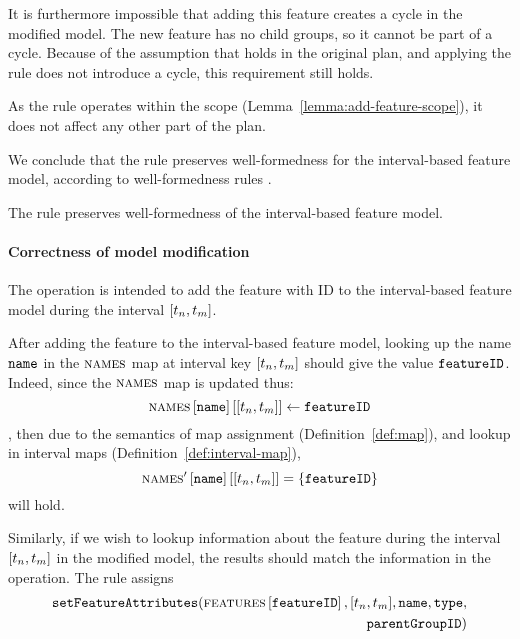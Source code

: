 It is furthermore impossible that adding this feature creates a cycle in the modified model. The new feature has no child groups, so it cannot be part of a cycle. Because of the assumption that  holds in the original plan, and applying the rule does not introduce a cycle, this requirement still holds. 

As the rule operates within the scope (Lemma~\vref{lemma:add-feature-scope}), it does not affect any other part of the plan.

We conclude that the  rule preserves well-formedness for the interval-based feature model, according to well-formedness rules . 
\\
\begin{lemma}
   The  rule preserves well-formedness of the interval-based feature model.
   \label{lemma:add-feature-well-formed}
\end{lemma}

\paragraph{Correctness of model modification}

The operation is intended to add the feature with ID  to the interval-based feature model during the interval $\interval{t_n}{t_m}$. 

After adding the feature to the interval-based feature model, looking up the name $\texttt{name}$ in the $\textsc{names}{}$ map at interval key $\interval{t_n}{t_m}$ should give the value $\texttt{featureID}$. Indeed, since the $\textsc{names}{}$ map is updated thus:
\[
   \lookup{\lookup{\names}{\var{name}}}{\interval{t_n}{t_m}} \assign \var{featureID}
\]
, then due to the semantics of map assignment (Definition~\vref{def:map}), and lookup in interval maps (Definition~\vref{def:interval-map}),
\[
   \lookup{\lookup{\names'}{\var{name}}}{\interval{t_n}{t_m}} = \set{\var{featureID}}
\]
will hold.

Similarly, if we wish to lookup information about the feature during the interval $\interval{t_n}{t_m}$ in the modified model, the results should match the information in the operation. The rule assigns 
\begin{equation*}
   \begin{split}
   \var{setFeatureAttributes}(\lookup{\features{}}{\var{featureID}}, \interval{t_n}{t_m}, \var{name}, \var{type}, \\
   \var{parentGroupID})
   \end{split}
\end{equation*}

